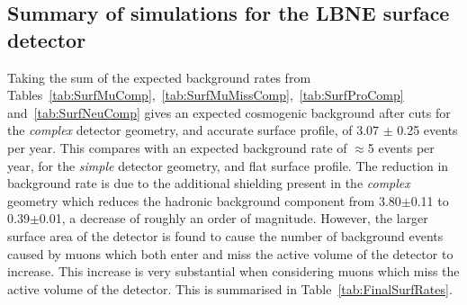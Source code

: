 \subsection{Summary of simulations for the LBNE surface detector}
Taking the sum of the expected background rates from Tables~\ref{tab:SurfMuComp},~\ref{tab:SurfMuMissComp},~\ref{tab:SurfProComp} and~\ref{tab:SurfNeuComp} gives an expected cosmogenic background after cuts for the \emph{complex} detector geometry, and accurate surface profile, of 3.07 $\pm$ 0.25 events per year. This compares with an expected background rate of $\approx$5 events per year, for the \emph{simple} detector geometry, and flat surface profile. The reduction in background rate is due to the additional shielding present in the \emph{complex} geometry which reduces the hadronic background component from 3.80$\pm$0.11 to 0.39$\pm$0.01, a decrease of roughly an order of magnitude. However, the larger surface area of the detector is found to cause the number of background events caused by muons which both enter and miss the active volume of the detector to increase. This increase is very substantial when considering muons which miss the active volume of the detector. This is summarised in Table~\ref{tab:FinalSurfRates}. \\

